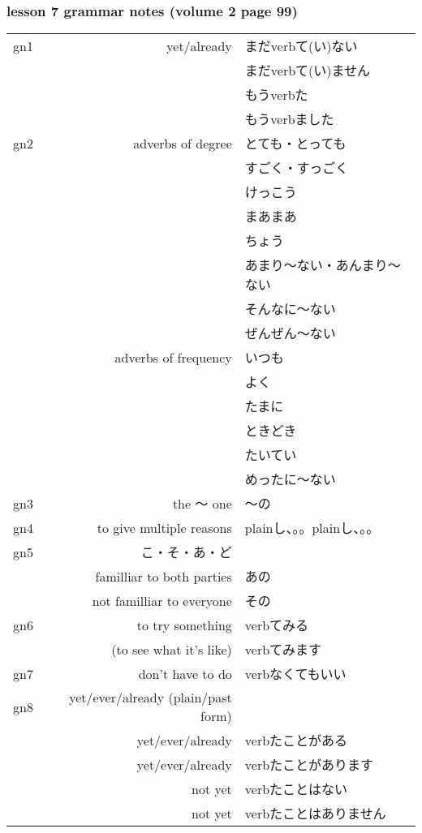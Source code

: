 \documentclass[14pt,onecolumn]{extarticle}
\begin{document}
\begin{CJK}{UTF8}{min}

\subsubsection{lesson 7 grammar notes (volume 2 page 99)}

\begin{tabular}{lrl}

gn1&yet/already&
  まだverbて(い)ない\\
&&まだverbて(い)ません\\
&&もうverbた\\
&&もうverbました\\
\hline

gn2&adverbs of degree&
  とても・とっても\\
&&すごく・すっごく\\
&&けっこう\\
&&まあまあ\\
&&ちょう\\
&&あまり〜ない・あんまり〜ない\\
&&そんなに〜ない\\
&&ぜんぜん〜ない\\
&adverbs of frequency&
  いつも\\
&&よく\\
&&たまに\\
&&ときどき\\
&&たいてい\\
&&めったに〜ない\\
\hline

gn3&the 〜 one&〜の\\
\hline

gn4&to give multiple reasons&plainし、。。plainし、。。\\
\hline

gn5&こ・そ・あ・ど&\\
&familliar to both parties&あの\\
&not familliar to everyone&その\\
\hline

gn6&to try something&
  verbてみる\\
&(to see what it's like)&
  verbてみます\\
\hline

gn7&don't have to do&verbなくてもいい\\
\hline

gn8&yet/ever/already (plain/past form)&\\
&yet/ever/already&verbたことがある\\
&yet/ever/already&verbたことがあります\\
&not yet&verbたことはない\\
&not yet&verbたことはありません\\
\hline


\end{tabular}
\end{CJK}
\end{document}
